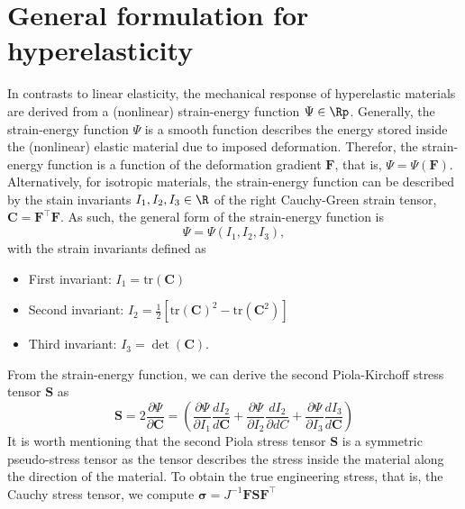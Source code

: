 \section{General formulation for hyperelasticity}
In contrasts to linear elasticity, the mechanical response of hyperelastic materials are derived from a (nonlinear) strain-energy function ${\Psi} \in \Rp$. Generally, the strain-energy function ${\Psi}$ is a smooth function describes the energy stored inside the (nonlinear) elastic material due to imposed deformation. Therefor, the strain-energy function is a function of the deformation gradient $\boldsymbol{F}$, that is, ${\Psi} = {\Psi}(\boldsymbol{F})$. Alternatively, for isotropic materials, the strain-energy function can be described by the stain invariants $I_1,I_2,I_3 \in \R $ of the right Cauchy-Green strain tensor, $\boldsymbol{C} =\boldsymbol{F}^\top\! \boldsymbol{F}$. As such, the general form of the strain-energy function is
\begin{equation}
	{\Psi} = {\Psi}(I_1,I_2,I_3),
\end{equation}
with the strain invariants defined as
\begin{itemize}
\item First invariant: $I_1 = \text{tr}(\boldsymbol{C})$
\item Second invariant: $I_2 = \frac{1}{2}\left[ \text{tr}(\boldsymbol{C})^2 - \text{tr}(\boldsymbol{C}^2) \right]$
\item Third invariant: $I_3 = \det(\boldsymbol{C})$.
\end{itemize}
From the strain-energy function, we can derive the second Piola-Kirchoff stress tensor $\boldsymbol{S}$ as
\begin{equation}
	\boldsymbol{S} = 2 \frac{\partial \Psi}{\partial \boldsymbol{C}} = \left( \frac{\partial \Psi}{\partial I_1} \frac{d I_2}{d \boldsymbol{C} } + \frac{\partial \Psi}{\partial I_2} \frac{d I_2}{\partial d{C} } +  \frac{\partial \Psi}{\partial I_3} \frac{d I_3}{d \boldsymbol{C} }\right)
\end{equation}
It is worth mentioning that the second Piola stress tensor $\boldsymbol{S}$ is a symmetric pseudo-stress tensor as the tensor describes the stress inside the material along the direction of the material. To obtain the true engineering stress, that is, the Cauchy stress tensor, we compute $
\boldsymbol{\sigma}	=  J^{-1} \boldsymbol{F} \boldsymbol{S} \boldsymbol{F}^\top$

